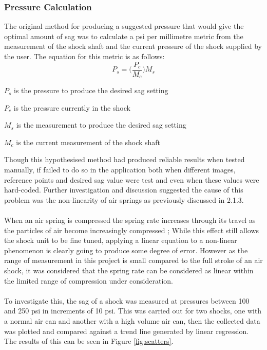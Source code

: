 		\subsubsection{Pressure Calculation}\label{sec:results_pressure_calculation}
			The original method for producing a suggested pressure that would give the optimal amount of sag was to calculate a  psi per millimetre metric from the measurement of the shock shaft and the current pressure of the shock supplied by the user. The equation for this metric is as follows:
			\begin{equation}
				\label{equ:pxpermm}
				P_s = \Bigg(\frac{P_c}{M_c}\Bigg)M_s
			\end{equation}
			\begin{where}
				\item $P_s$ is the pressure to produce the desired sag setting
				\item $P_c$ is the pressure currently in the shock
				\item $M_s$ is the measurement to produce the desired sag setting
				\item $M_c$ is the current measurement of the shock shaft
			\end{where}
			\vspace{5mm}
			Though this hypothesised method had produced reliable results when tested manually, if failed to do so in the application both when different images, reference points and desired sag value were test and even when these values were hard-coded. Further investigation and discussion suggested the cause of this problem was the non-linearity of air springs as previously discussed in 2.1.3. 
			\\\\
			When an air spring is compressed the spring rate increases through its travel as the particles of air become increasingly compressed \citep{goodyear2014air}; While this effect still allows the shock unit to be fine tuned, applying a linear equation to a non-linear phenomenon is clearly going to produce some degree of error. However as the range of measurement in this project is small compared to the full stroke of an air shock, it was considered that the spring rate can be considered as linear within the limited range of compression under consideration.
			\\\\
			To investigate this, the sag of a shock was measured at pressures between 100 and 250 psi in increments of 10 psi. This was carried out for two shocks, one with a normal air can and another with a high volume air can, then the collected data was plotted and compared against a trend line generated by linear regression. The results of this can be seen in Figure \ref{fig:scatters}.
